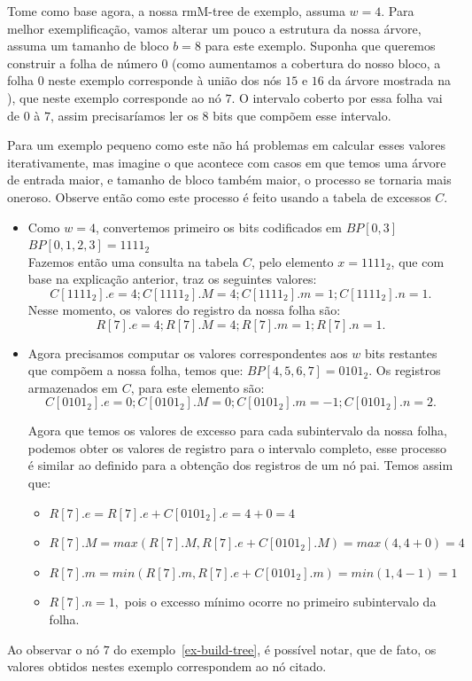\begin{example}
    Tome como base agora, a nossa rmM-tree de exemplo, assuma $w=4$. Para melhor exemplificação, vamos alterar um pouco a estrutura da nossa árvore, assuma um tamanho de bloco  $b=8$ para este exemplo. Suponha que queremos construir a folha de número $0$ (como aumentamos a cobertura do nosso bloco, a folha $0$ neste exemplo corresponde à união dos nós $15$ e $16$ da árvore mostrada na ), que neste exemplo corresponde ao nó $7$. O intervalo coberto por essa folha vai de $0$ à $7$, assim precisaríamos ler os $8$ bits que compõem esse intervalo. 
    
    Para um exemplo pequeno como  este não há problemas em calcular esses valores iterativamente, mas imagine o que acontece com casos em que temos uma árvore de entrada maior, e tamanho de  bloco também maior, o processo se tornaria mais oneroso. Observe então como este processo é feito usando a tabela de excessos $C$.


    \begin{itemize}
        \item Como $w=4$, convertemos primeiro os bits codificados em $BP[0,3]$\\
        $BP[0,1,2,3] = 1111_2$\\
        Fazemos então uma consulta na tabela $C$, pelo elemento $x = 1111_2$, que com base na explicação anterior, traz os seguintes valores:
        $$C[1111_2].e = 4; C[1111_2].M = 4; C[1111_2].m = 1; C[1111_2].n=1.$$
        Nesse momento, os valores do registro da nossa folha são:\\
        $$R[7].e = 4; R[7].M = 4; R[7].m = 1; R[7].n=1.$$
        \item  Agora precisamos computar os valores correspondentes aos $w$ bits restantes que compõem a nossa folha, temos que:
        $BP[4,5,6,7] = 0101_2$. Os registros armazenados em $C$, para este elemento são:
        $$C[0101_2].e = 0; C[0101_2].M = 0; C[0101_2].m = -1; C[0101_2].n=2.$$

        Agora que temos os valores de excesso para cada subintervalo da nossa folha, podemos obter os valores de registro para o intervalo completo, esse processo é similar ao definido para a obtenção dos registros de um nó pai. Temos assim que:
        \begin{itemize}
            \item $R[7].e = R[7].e + C[0101_2].e = 4 + 0 = 4$
            \item $R[7].M = max(R[7].M, R[7].e + C[0101_2].M) =  max(4,4+0) =4$
            \item $R[7].m = min(R[7].m, R[7].e + C[0101_2].m) = min(1,4-1) = 1$
            \item $R[7].n=1,$ pois o excesso mínimo ocorre no primeiro subintervalo da folha.
        \end{itemize}
    \end{itemize}

    Ao observar o nó $7$ do exemplo~\ref{ex-build-tree}, é possível notar, que de fato, os valores obtidos nestes exemplo correspondem ao nó citado.
\end{example}

